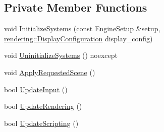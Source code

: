 \subsection*{Private Member Functions}
\begin{DoxyCompactItemize}
\item 
void \hyperlink{classmage_1_1_engine_aec74e74ebec5c7739740bbeb825526ad}{Initialize\+Systems} (const \hyperlink{classmage_1_1_engine_setup}{Engine\+Setup} \&setup, \hyperlink{classmage_1_1rendering_1_1_display_configuration}{rendering\+::\+Display\+Configuration} display\+\_\+config)
\item 
void \hyperlink{classmage_1_1_engine_ac0632bce91156f13d4bc76f5b25fc94b}{Uninitialize\+Systems} () noexcept
\item 
void \hyperlink{classmage_1_1_engine_a4fcb9760814dfa59c9fff34f1c82357b}{Apply\+Requested\+Scene} ()
\item 
bool \hyperlink{classmage_1_1_engine_ad35eef077bc695803769a385e2751cbe}{Update\+Input} ()
\item 
bool \hyperlink{classmage_1_1_engine_a5a39d76019d51290a5ba305c57384fae}{Update\+Rendering} ()
\item 
bool \hyperlink{classmage_1_1_engine_a3c7a55a89a23952a368432f933a90d26}{Update\+Scripting} ()
\end{DoxyCompactItemize}

